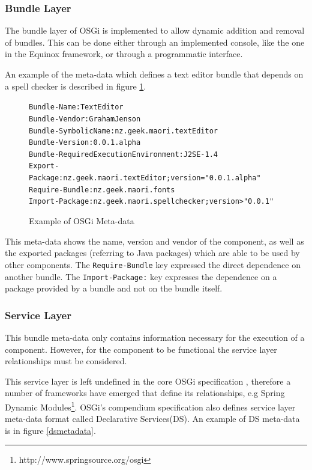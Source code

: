 \subsubsection{Bundle Layer}
The bundle layer of OSGi is implemented to allow dynamic addition and removal of bundles.
This can be done either through an implemented console, like the one in the Equinox framework, or through a programmatic interface.

An example of the meta-data which defines a text editor bundle that depends on a spell checker is described in figure \ref{osgibundle}.

\begin{figure}[htp]
\begin{center}
\begin{alltt}
Bundle-Name: TextEditor
Bundle-Vendor: Graham Jenson
Bundle-SymbolicName: nz.geek.maori.textEditor
Bundle-Version: 0.0.1.alpha
Bundle-RequiredExecutionEnvironment: J2SE-1.4
Export-Package: nz.geek.maori.textEditor;version="0.0.1.alpha"
Require-Bundle: nz.geek.maori.fonts
Import-Package: nz.geek.maori.spellchecker;version>"0.0.1"
\end{alltt}
  \caption[OSGi Meta-data]{Example of OSGi Meta-data}
  \label{osgibundle}
\end{center}
\end{figure}

This meta-data shows the name, version and vendor of the component, as well as the exported packages (referring to Java packages) which are able to be used by other components.
The \verb+Require-Bundle+ key expressed the direct dependence on another bundle.
The \verb+Import-Package:+ key expresses the dependence on a package provided by a bundle and not on the bundle itself.

\subsubsection{Service Layer}
This bundle meta-data only contains information necessary for the execution of a component.
However, for the component to be functional the service layer relationships must be considered.

This service layer is left undefined in the core OSGi specification \citep{osgicore2007}, therefore a number of frameworks have emerged that define its relationships, e.g
Spring Dynamic Modules\footnote{http://www.springsource.org/osgi}.
OSGi's compendium specification \citep{osgicompendium2007} also defines service layer meta-data format called Declarative Services(DS).
An example of DS meta-data is in figure \ref{dsmetadata}.

